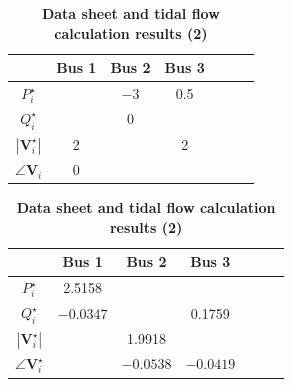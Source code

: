 \documentclass[tombow,dvipdfmx]{corona-a5-1.1}
\begin{document}
\begin{table}[h]
\medskip
\caption{\textbf{Data sheet and tidal flow calculation results (2)}} \label{table:pflow2}
 \centering
  {
  \begin{minipage}{0.49\linewidth}
    \centering
  \begin{tabular}{|c|c|c|c|c|c|c|}
   \hline
 & Bus 1 & Bus 2 & Bus 3 \\
   \hline 
   $P_i^{\star}$ &  & $-3$ & 0.5 \\
   \hline    
   $Q_i^{\star}$ &  & 0 & \\
   \hline
   $|\bm{V}_i^{\star}|$ & 2 & & 2 \\
   \hline
   $\angle \bm{V}_i$ & 0 & &  \\
   \hline
  \end{tabular}
  \end{minipage}
  \begin{minipage}{0.49\linewidth}
    \centering
  \begin{tabular}{|c|c|c|c|c|c|c|}
   \hline
   & Bus 1 & Bus 2 & Bus 3 \\
   \hline 
   $P_i^{\star}$ & 2.5158 & &  \\
   \hline
   $Q_i^{\star}$ & $-0.0347$ & & 0.1759 \\
   \hline
   $|\bm{V}_i^{\star}|$ & & 1.9918 & \\
   \hline
   $\angle \bm{V}_i^{\star}$ & & $-0.0538$ & $-0.0419$ \\
   \hline
  \end{tabular}
  \end{minipage}
  }
\end{table}
\end{document}
